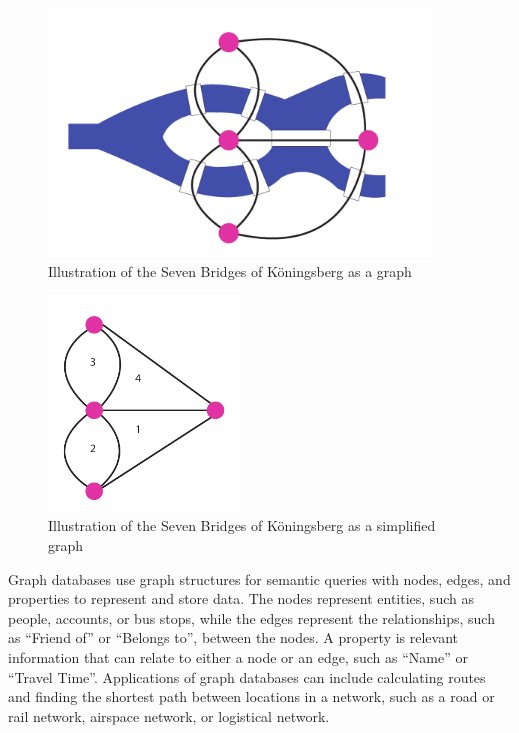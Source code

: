 \begin{figure}[H]
  \centering
  \includegraphics[width=4in]{assets/7bridges.pdf}
  \caption{Illustration of the Seven Bridges of Köningsberg as a graph}
  \label{fig:7bridgesIllustration}
\end{figure}

\begin{figure}[H]
  \centering
  \includegraphics[width=2in]{assets/7bridges2.pdf}
  \caption{Illustration of the Seven Bridges of Köningsberg as a simplified graph} 
  \label{fig:7bridgesSimplification}
\end{figure}

Graph databases use graph structures for semantic queries with nodes, edges, and properties to represent and store data.
The nodes represent entities, such as people, accounts, or bus stops, while the edges represent the relationships, such as ``Friend of'' or ``Belongs to'', between the nodes. A property is relevant information that can relate to either a node or an edge, such as ``Name'' or ``Travel Time''.
Applications of graph databases can include calculating routes and finding the shortest path between locations in a network, such as a road or rail network, airspace network, or logistical network\citep[p.102]{robinson13}. 


